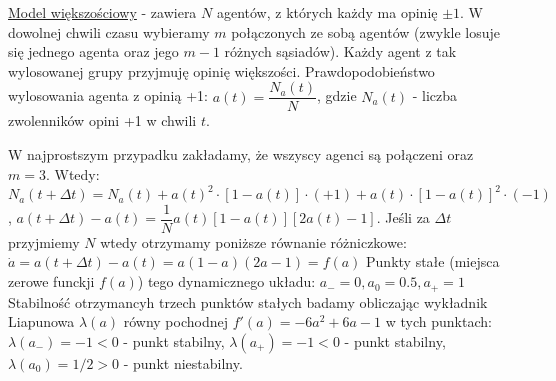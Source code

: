 \underline{Model większościowy} - zawiera $ N $ agentów, z których każdy ma opinię $ \pm 1 $. W dowolnej chwili czasu wybieramy $ m $ połączonych ze sobą agentów (zwykle losuje się jednego agenta oraz jego $ m - 1 $ różnych sąsiadów). Każdy agent z tak wylosowanej grupy przyjmuję opinię większości. Prawdopodobieństwo wylosowania agenta z opinią +1:\newline
$ a(t) = \dfrac{N_a(t)}{N} $, gdzie $ N_a(t) $ - liczba zwolenników opini +1 w chwili $ t $.

W najprostszym przypadku zakładamy, że wszyscy agenci są połączeni oraz $ m = 3 $. Wtedy:\newline
$ N_a(t+\Delta t) = N_a(t) + a(t)^2\cdot [1-a(t)] \cdot (+1) + a(t) \cdot [1-a(t)]^2 \cdot (-1) $,\newline
$ a(t + \Delta t) - a(t) = \dfrac{1}{N}a(t)[1-a(t)][2a(t) - 1] $.\newline
Jeśli za $ \Delta t $ przyjmiemy $ N $ wtedy otrzymamy poniższe równanie różniczkowe:\newline
$ \dot{a} = a(t + \Delta t) - a(t) = a(1-a)(2a - 1) = f(a) $\newline
Punkty stałe (miejsca zerowe funckji $ f(a) $) tego dynamicznego układu:\newline
$ a_- = 0, a_0 = 0.5, a_+ = 1 $
Stabilność otrzymancyh trzech punktów stałych badamy obliczając wykładnik Liapunowa $ \lambda (a) $ równy pochodnej $ f'(a) = -6a^2 +6a - 1 $ w tych punktach: \newline
$ \lambda(a_-) = -1 < 0 $ - punkt stabilny,\newline
$ \lambda(a_+) = -1 < 0 $ - punkt stabilny,\newline
$ \lambda(a_0) = 1/2 > 0 $ - punkt niestabilny.